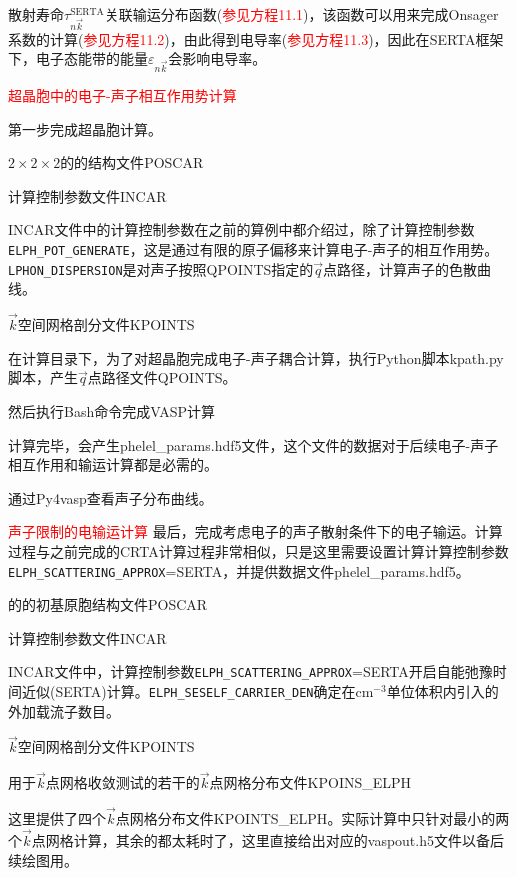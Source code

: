 {散射寿命$\tau_{n\vec k}^{\mathrm{SERTA}}$关联输运分布函数(\textcolor{red}{参见方程11.1})，该函数可以用来完成\textrm{Onsager}系数的计算(\textcolor{red}{参见方程11.2})，由此得到电导率(\textcolor{red}{参见方程11.3})，因此在\textrm{SERTA}框架下，电子态能带的能量$\varepsilon_{n\vec k}$会影响电导率。


\textcolor{red}{超晶胞中的电子-声子相互作用势计算}

第一步完成超晶胞计算。

$2\times2\times2$的的结构文件\textrm{POSCAR}

计算控制参数文件\textrm{INCAR}

\textrm{INCAR}文件中的计算控制参数在之前的算例中都介绍过，除了计算控制参数\texttt{ELPH\_POT\_GENERATE}，这是通过有限的原子偏移来计算电子-声子的相互作用势。\texttt{LPHON\_DISPERSION}是对声子按照\textrm{QPOINTS}指定的$\vec q$点路径，计算声子的色散曲线。

$\vec k$空间网格剖分文件\textrm{KPOINTS}

在计算目录下，为了对超晶胞完成电子-声子耦合计算，执行\textrm{Python}脚本\textrm{kpath.py}脚本，产生$\vec q$点路径文件\textrm{QPOINTS}。

然后执行\textrm{Bash}命令完成\textrm{VASP计算}

计算完毕，会产生\textrm{phelel\_params.hdf5}文件，这个文件的数据对于后续电子-声子相互作用和输运计算都是必需的。

通过\textrm{Py4vasp}查看声子分布曲线。

\textcolor{red}{声子限制的电输运计算}
最后，完成考虑电子的声子散射条件下的电子输运。计算过程与之前完成的\textrm{CRTA}计算过程非常相似，只是这里需要设置计算计算控制参数\texttt{ELPH\_SCATTERING\_APPROX}=\textrm{SERTA}，并提供数据文件\textrm{phelel\_params.hdf5}。

的的初基原胞结构文件\textrm{POSCAR}

计算控制参数文件\textrm{INCAR}

\textrm{INCAR}文件中，计算控制参数\texttt{ELPH\_SCATTERING\_APPROX}=\textrm{SERTA}开启自能弛豫时间近似\textrm{(SERTA)}计算。\texttt{ELPH\_SESELF\_CARRIER\_DEN}确定在$\mathrm{cm}^{-3}$单位体积内引入的外加载流子数目。

$\vec k$空间网格剖分文件\textrm{KPOINTS}

用于$\vec k$点网格收敛测试的若干的$\vec k$点网格分布文件\textrm{KPOINS\_ELPH}

这里提供了四个$\vec k$点网格分布文件\textrm{KPOINTS\_ELPH}。实际计算中只针对最小的两个$\vec k$点网格计算，其余的都太耗时了，这里直接给出对应的\textrm{vaspout.h5}文件以备后续绘图用。%

}

